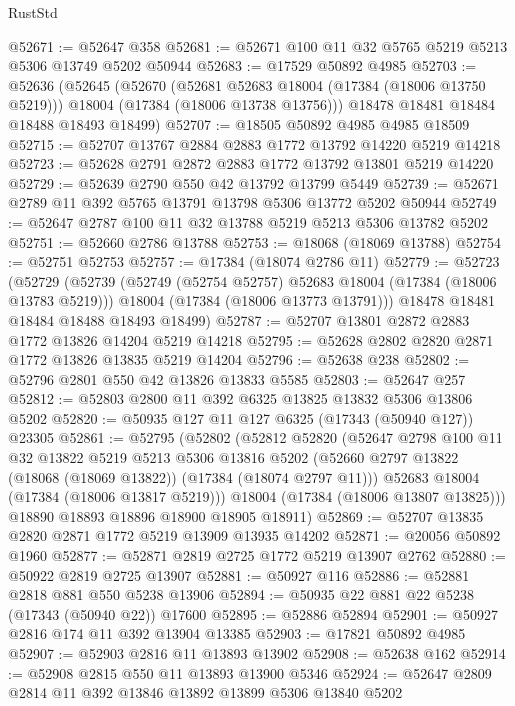 \begin{lexlean}{RustStd}
\begin{coremodule}
@52671 := @52647 @358
@52681 := @52671 @100 @11 @32 @5765 @5219 @5213 @5306 @13749 @5202 @50944
@52683 := @17529 @50892 @4985
@52703 := @52636
    (@52645
      (@52670
        (@52681 @52683 @18004 (@17384 (@18006 @13750 @5219)))
        @18004
        (@17384 (@18006 @13738 @13756)))
      @18478
      @18481
      @18484
      @18488
      @18493
      @18499)
@52707 := @18505 @50892 @4985 @4985 @18509
@52715 := @52707 @13767 @2884 @2883 @1772 @13792 @14220 @5219 @14218
@52723 := @52628 @2791 @2872 @2883 @1772 @13792 @13801 @5219 @14220
@52729 := @52639 @2790 @550 @42 @13792 @13799 @5449
@52739 := @52671 @2789 @11 @392 @5765 @13791 @13798 @5306 @13772 @5202 @50944
@52749 := @52647 @2787 @100 @11 @32 @13788 @5219 @5213 @5306 @13782 @5202
@52751 := @52660 @2786 @13788
@52753 := @18068 (@18069 @13788)
@52754 := @52751 @52753
@52757 := @17384 (@18074 @2786 @11)
@52779 := @52723
    (@52729
      (@52739
        (@52749 (@52754 @52757) @52683 @18004 (@17384 (@18006 @13783 @5219)))
        @18004
        (@17384 (@18006 @13773 @13791)))
      @18478
      @18481
      @18484
      @18488
      @18493
      @18499)
@52787 := @52707 @13801 @2872 @2883 @1772 @13826 @14204 @5219 @14218
@52795 := @52628 @2802 @2820 @2871 @1772 @13826 @13835 @5219 @14204
@52796 := @52638 @238
@52802 := @52796 @2801 @550 @42 @13826 @13833 @5585
@52803 := @52647 @257
@52812 := @52803 @2800 @11 @392 @6325 @13825 @13832 @5306 @13806 @5202
@52820 := @50935 @127 @11 @127 @6325 (@17343 (@50940 @127)) @23305
@52861 := @52795
    (@52802
      (@52812
        @52820
        (@52647
          @2798
          @100
          @11
          @32
          @13822
          @5219
          @5213
          @5306
          @13816
          @5202
          (@52660 @2797 @13822 (@18068 (@18069 @13822)) (@17384 (@18074 @2797 @11)))
          @52683
          @18004
          (@17384 (@18006 @13817 @5219)))
        @18004
        (@17384 (@18006 @13807 @13825)))
      @18890
      @18893
      @18896
      @18900
      @18905
      @18911)
@52869 := @52707 @13835 @2820 @2871 @1772 @5219 @13909 @13935 @14202
@52871 := @20056 @50892 @1960
@52877 := @52871 @2819 @2725 @1772 @5219 @13907 @2762
@52880 := @50922 @2819 @2725 @13907
@52881 := @50927 @116
@52886 := @52881 @2818 @881 @550 @5238 @13906
@52894 := @50935 @22 @881 @22 @5238 (@17343 (@50940 @22)) @17600
@52895 := @52886 @52894
@52901 := @50927 @2816 @174 @11 @392 @13904 @13385
@52903 := @17821 @50892 @4985
@52907 := @52903 @2816 @11 @13893 @13902
@52908 := @52638 @162
@52914 := @52908 @2815 @550 @11 @13893 @13900 @5346
@52924 := @52647 @2809 @2814 @11 @392 @13846 @13892 @13899 @5306 @13840 @5202

\end{coremodule}
\end{lexlean}
